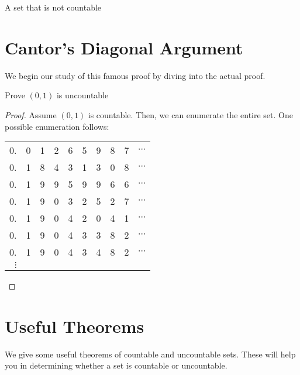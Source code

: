 \documentclass[main.tex]{subfiles}
\begin{document}
\begin{defn}[Uncountable]
	A set that is not countable
\end{defn}

\section{Cantor's Diagonal Argument}

We begin our study of this famous proof by diving into the actual proof.

\begin{example}
	Prove \((0,1)\) is uncountable
	
	\begin{proof}
		Assume \((0,1)\) is countable. Then, we can enumerate the entire set. One possible enumeration follows:
		
		\begin{tabular}{rlllllllll}
			0. & 0 & 1 & 2 & 6 & 5 & 9 & 8 & 7 & \(\cdots\) \\
			0. & 1 & 8 & 4 & 3 & 1 & 3 & 0 & 8 & \(\cdots\) \\
			0. & 1 & 9 & 9 & 5 & 9 & 9 & 6 & 6 & \(\cdots\) \\
			0. & 1 & 9 & 0 & 3 & 2 & 5 & 2 & 7 & \(\cdots\) \\
			0. & 1 & 9 & 0 & 4 & 2 & 0 & 4 & 1 & \(\cdots\) \\
			0. & 1 & 9 & 0 & 4 & 3 & 3 & 8 & 2 & \(\cdots\) \\
			0. & 1 & 9 & 0 & 4 & 3 & 4 & 8 & 2 & \(\cdots\) \\
			\(\vdots\) \\
		\end{tabular}
	\end{proof}
\end{example}

\section{Useful Theorems}

We give some useful theorems of countable and uncountable sets. These will help you in determining whether a set is countable or uncountable.

%
%
%
\end{document}
